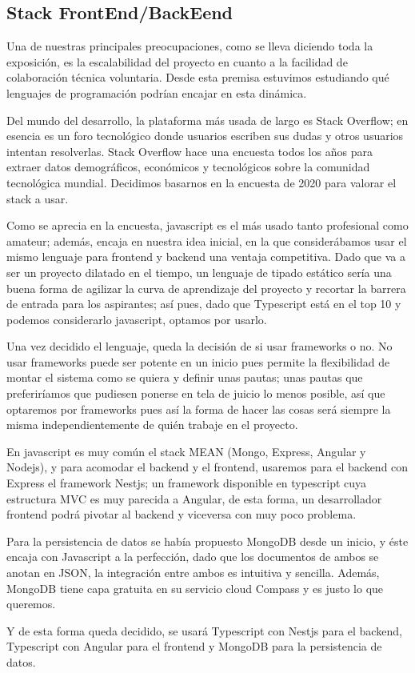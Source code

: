 \subsection{Stack FrontEnd/BackEend}
Una de nuestras principales preocupaciones, como se lleva diciendo toda la exposición, es la escalabilidad del proyecto en cuanto a la facilidad de colaboración técnica voluntaria. Desde esta premisa estuvimos estudiando qué lenguajes de programación podrían encajar en esta dinámica.
\vspace{1em}
\par Del mundo del desarrollo, la plataforma más usada de largo es Stack Overflow; en esencia es un foro tecnológico donde usuarios escriben sus dudas y otros usuarios intentan resolverlas. Stack Overflow hace una encuesta todos los años para extraer datos demográficos, económicos y tecnológicos sobre la comunidad tecnológica mundial. Decidimos basarnos en la encuesta de 2020 \citep{techSurveyStackOverflow} para valorar el stack a usar.
\vspace{1em}
\par Como se aprecia en la encuesta, javascript es el más usado tanto profesional como amateur; además, encaja en nuestra idea inicial, en la que considerábamos usar el mismo lenguaje para frontend y backend una ventaja competitiva. Dado que va a ser un proyecto dilatado en el tiempo, un lenguaje de tipado estático sería una buena forma de agilizar la curva de aprendizaje del proyecto y recortar la barrera de entrada para los aspirantes; así pues, dado que Typescript está en el top 10 y podemos considerarlo javascript, optamos por usarlo.
\vspace{1em}
\par Una vez decidido el lenguaje, queda la decisión de si usar frameworks o no. No usar frameworks puede ser potente en un inicio pues permite la flexibilidad de montar el sistema como se quiera y definir unas pautas; unas pautas que preferiríamos que pudiesen ponerse en tela de juicio lo menos posible, así que optaremos por frameworks pues así la forma de hacer las cosas será siempre la misma independientemente de quién trabaje en el proyecto.
\vspace{1em}
\par En javascript es muy común el stack MEAN (Mongo, Express, Angular y Nodejs), y para acomodar el backend y el frontend, usaremos para el backend con Express el framework Nestjs; un framework disponible en typescript cuya estructura MVC es muy parecida a Angular, de esta forma, un desarrollador frontend podrá pivotar al backend y viceversa con muy poco problema.
\vspace{1em}
\par Para la persistencia de datos se había propuesto MongoDB desde un inicio, y éste encaja con Javascript a la perfección, dado que los documentos de ambos se anotan en JSON, la integración entre ambos es intuitiva y sencilla. Además, MongoDB tiene capa gratuita en su servicio cloud Compass y es justo lo que queremos. 
\vspace{1em}
\par Y de esta forma queda decidido, se usará Typescript con Nestjs para el backend, Typescript con Angular para el frontend y MongoDB para la persistencia de datos. 
\clearpage
